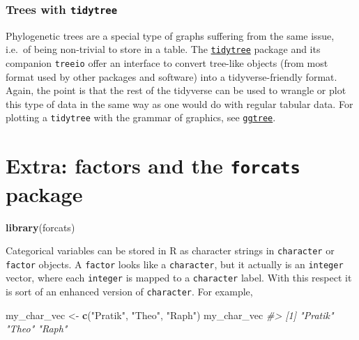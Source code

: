 \documentclass[]{book}
\newenvironment{Shaded}{}{}
\newcommand{\CommentTok}[1]{\textcolor[rgb]{0.38,0.63,0.69}{\textit{#1}}}
\newcommand{\KeywordTok}[1]{\textcolor[rgb]{0.00,0.44,0.13}{\textbf{#1}}}
\newcommand{\NormalTok}[1]{#1}
\newcommand{\StringTok}[1]{\textcolor[rgb]{0.25,0.44,0.63}{#1}}
\begin{document}
\hypertarget{trees-with-tidytree}{%
\subsubsection{\texorpdfstring{Trees with \texttt{tidytree}}{Trees with tidytree}}\label{trees-with-tidytree}}

Phylogenetic trees are a special type of graphs suffering from the same issue, i.e.~of being non-trivial to store in a table. The \href{https://yulab-smu.github.io/treedata-book/}{\texttt{tidytree}} package and its companion \texttt{treeio} offer an interface to convert tree-like objects (from most format used by other packages and software) into a tidyverse-friendly format. Again, the point is that the rest of the tidyverse can be used to wrangle or plot this type of data in the same way as one would do with regular tabular data. For plotting a \texttt{tidytree} with the grammar of graphics, see \href{https://guangchuangyu.github.io/ggtree-book/chapter-ggtree.html}{\texttt{ggtree}}.

\hypertarget{extra-factors-and-the-forcats-package}{%
\section{\texorpdfstring{Extra: factors and the \texttt{forcats} package}{Extra: factors and the forcats package}}\label{extra-factors-and-the-forcats-package}}

\begin{Shaded}
\begin{Highlighting}[]
\KeywordTok{library}\NormalTok{(forcats)}
\end{Highlighting}
\end{Shaded}

Categorical variables can be stored in R as character strings in \texttt{character} or \texttt{factor} objects. A \texttt{factor} looks like a \texttt{character}, but it actually is an \texttt{integer} vector, where each \texttt{integer} is mapped to a \texttt{character} label. With this respect it is sort of an enhanced version of \texttt{character}. For example,

\begin{Shaded}
\begin{Highlighting}[]
\NormalTok{my_char_vec <-}\StringTok{ }\KeywordTok{c}\NormalTok{(}\StringTok{"Pratik"}\NormalTok{, }\StringTok{"Theo"}\NormalTok{, }\StringTok{"Raph"}\NormalTok{)}
\NormalTok{my_char_vec}
\CommentTok{#> [1] "Pratik" "Theo"   "Raph"}
\end{Highlighting}
\end{Shaded}
\end{document}
